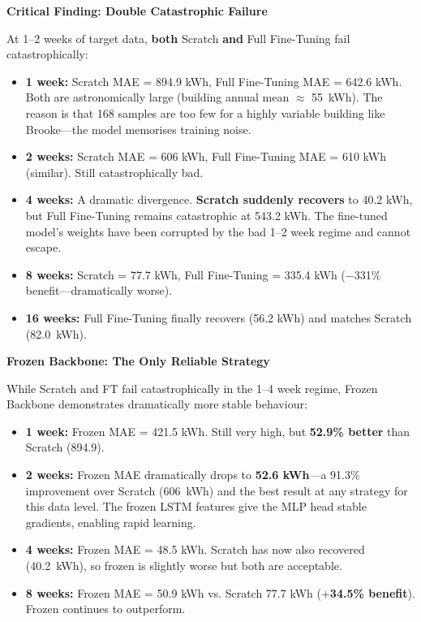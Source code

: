 \documentclass[12pt,a4paper]{report}
\begin{document}
\textbf{Critical Finding: Double Catastrophic Failure}

At 1--2 weeks of target data, \textbf{both} Scratch \textbf{and} Full Fine-Tuning fail catastrophically:

\begin{itemize}
    \item \textbf{1 week:} Scratch MAE = 894.9 kWh, Full Fine-Tuning MAE = 642.6 kWh. Both are astronomically large (building annual mean $\approx$ 55~kWh). The reason is that 168 samples are too few for a highly variable building like Brooke—the model memorises training noise.
    \item \textbf{2 weeks:} Scratch MAE = 606 kWh, Full Fine-Tuning MAE = 610 kWh (similar). Still catastrophically bad.
    \item \textbf{4 weeks:} A dramatic divergence. \textbf{Scratch suddenly recovers} to 40.2 kWh, but Full Fine-Tuning remains catastrophic at 543.2 kWh. The fine-tuned model's weights have been corrupted by the bad 1--2 week regime and cannot escape.
    \item \textbf{8 weeks:} Scratch = 77.7 kWh, Full Fine-Tuning = 335.4 kWh ($-$331\% benefit—dramatically worse).
    \item \textbf{16 weeks:} Full Fine-Tuning finally recovers (56.2 kWh) and matches Scratch (82.0~kWh).
\end{itemize}

\textbf{Frozen Backbone: The Only Reliable Strategy}

While Scratch and FT fail catastrophically in the 1--4 week regime, Frozen Backbone demonstrates dramatically more stable behaviour:

\begin{itemize}
    \item \textbf{1 week:} Frozen MAE = 421.5 kWh. Still very high, but \textbf{52.9\% better} than Scratch (894.9).
    \item \textbf{2 weeks:} Frozen MAE dramatically drops to \textbf{52.6 kWh}—a 91.3\% improvement over Scratch (606~kWh) and the best result at any strategy for this data level. The frozen LSTM features give the MLP head stable gradients, enabling rapid learning.
    \item \textbf{4 weeks:} Frozen MAE = 48.5 kWh. Scratch has now also recovered (40.2~kWh), so frozen is slightly worse but both are acceptable.
    \item \textbf{8 weeks:} Frozen MAE = 50.9 kWh vs. Scratch 77.7 kWh (+\textbf{34.5\% benefit}). Frozen continues to outperform.
\end{itemize}
\end{document}

